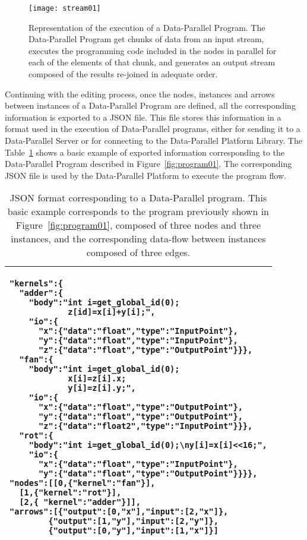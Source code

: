 \documentclass[conference]{IEEEtran}
\newcommand{\is}{250pt} \newcommand{\iss}{250pt}
\newcommand{\ist}{230pt}
\begin{document}
\begin{figure}[t]
\begin{center}
\texttt{[image: stream01]}
\end{center}
\caption{Representation of the execution of a Data-Parallel Program. The
  Data-Parallel Program get chunks of data from an input stream, executes the
  programming code included in the nodes in parallel for each of the elements of
  that chunk, and generates an output stream composed of the results re-joined
  in adequate order.}
\label{fig:stream01}
\end{figure}

Continuing with the editing process, once the nodes, instances and arrows
between instances of a Data-Parallel Program are defined, all the corresponding
information is exported to a JSON\cite{rfc4627} file.  This file stores this
information in a format used in the execution of Data-Parallel programs, either
for sending it to a Data-Parallel Server or for connecting to the Data-Parallel
Platform Library.  The Table~\ref{tab:simple} shows a basic example of exported
information corresponding to the Data-Parallel Program described in
Figure~\ref{fig:program01}.  The corresponding JSON file is used by the
Data-Parallel Platform to execute the program flow.

\begin{table}[t]
\begin{center}
\begin{tabular}{|p{\ist}|}
\hline\scriptsize
\begin{verbatim}
"kernels":{
  "adder":{
    "body":"int i=get_global_id(0);
            z[id]=x[i]+y[i];",
    "io":{
      "x":{"data":"float","type":"InputPoint"},
      "y":{"data":"float","type":"InputPoint"},
      "z":{"data":"float","type":"OutputPoint"}}},
  "fan":{
    "body":"int i=get_global_id(0);
            x[i]=z[i].x;
            y[i]=z[i].y;",
    "io":{
      "x":{"data":"float","type":"OutputPoint"},
      "y":{"data":"float","type":"OutputPoint"},
      "z":{"data":"float2","type":"InputPoint"}}},
  "rot":{
    "body":"int i=get_global_id(0);\ny[i]=x[i]<<16;",
    "io":{
      "x":{"data":"float","type":"InputPoint"},
      "y":{"data":"float","type":"OutputPoint"}}}},
"nodes":[[0,{"kernel":"fan"}],
  [1,{"kernel":"rot"}],
  [2,{ "kernel":"adder"}]],
"arrows":[{"output":[0,"x"],"input":[2,"x"]},
        {"output":[1,"y"],"input":[2,"y"]},
        {"output":[0,"y"],"input":[1,"x"]}]
\end{verbatim}
\\ \hline
\end{tabular}
\end{center}
\caption{JSON format corresponding to a Data-Parallel program. This basic
  example corresponds to the program previously shown in
  Figure~\ref{fig:program01}, composed of three nodes and three instances, and
  the corresponding data-flow between instances composed of three edges.}
\label{tab:simple}
\end{table}
\end{document}
